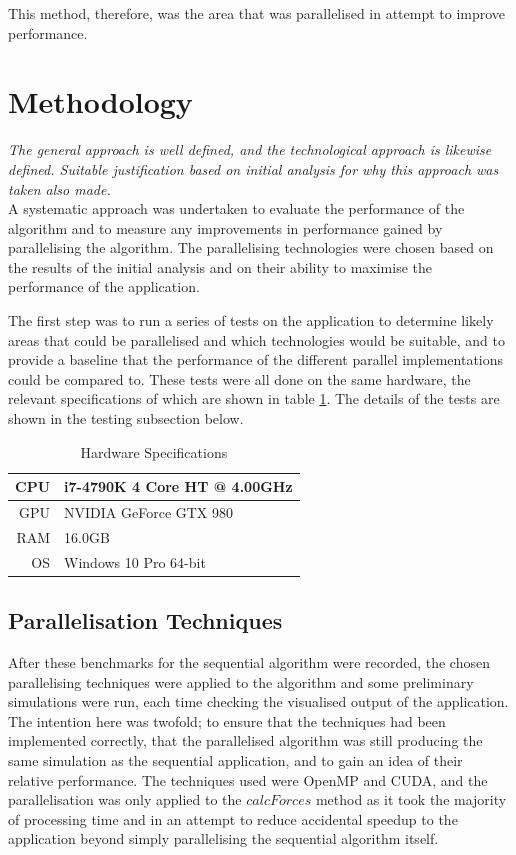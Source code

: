 \documentclass[12pt,journal,transmag]{IEEEtran}
\begin{document}
	This method, therefore, was the area that was parallelised in attempt to improve performance.
	
	\section{Methodology}
	
	\textit{The general approach is well defined, and the technological approach is likewise defined. Suitable justification based on initial analysis for why this approach was taken also made.}\\
	
	A systematic approach was undertaken to evaluate the performance of the algorithm and to measure any improvements in performance gained by parallelising the algorithm. The parallelising technologies were chosen based on the results of the initial analysis and on their ability to maximise the performance of the application.
	
	The first step was to run a series of tests on the application to determine likely areas that could be parallelised and which technologies would be suitable, and to provide a baseline that the performance of the different parallel implementations could be compared to. These tests were all done on the same hardware, the relevant specifications of which are shown in table \ref{hardware}. The details of the tests are shown in the testing subsection below.
	
	\begin{table}[!h]
		\renewcommand{\arraystretch}{1.3}
		\caption{Hardware Specifications}
		\label{hardware}
		\centering
		\begin{tabular}{r|l}
			\toprule
			CPU & i7-4790K 4 Core HT @ 4.00GHz\\ \hline
			GPU & NVIDIA GeForce GTX 980 \\ \hline
			RAM & 16.0GB\\ \hline
			OS & Windows 10 Pro 64-bit\\ \bottomrule
		\end{tabular}
	\end{table}
	
	\subsection{Parallelisation Techniques}
	After these benchmarks for the sequential algorithm were recorded, the chosen parallelising techniques were applied to the algorithm and some preliminary simulations were run, each time checking the visualised output of the application. The intention here was twofold; to ensure that the techniques had been implemented correctly, that the parallelised algorithm was still producing the same simulation as the sequential application, and to gain an idea of their relative performance. The techniques used were OpenMP and CUDA, and the parallelisation was only applied to the $calcForces$ method as it took the majority of processing time and in an attempt to reduce accidental speedup to the application beyond simply parallelising the sequential algorithm itself.
	
\end{document}
